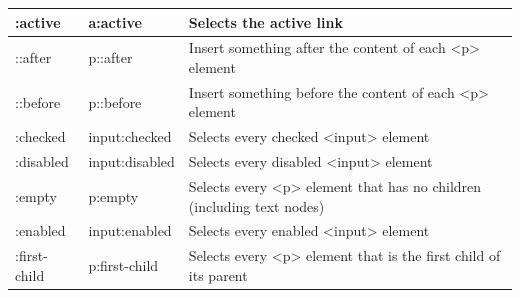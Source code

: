 \documentclass[11pt]{article}
\begin{document}
\begin{tabularx}{\textwidth}{|p{} | p{} | X|}
				\hline
				:active & a:active & Selects the active link \\
				\hline
				::after & p::after & Insert something after the content of each <p> element \\
				\hline
				::before & p::before & Insert something before the content of each <p> element \\
				\hline
				:checked & input:checked & Selects every checked <input> element \\
				\hline
				:disabled & input:disabled & Selects every disabled <input> element \\
				
				\hline
				:empty & p:empty & Selects every <p> element that has no children (including text nodes) \\
				\hline
				:enabled & input:enabled & Selects every enabled <input> element \\
				\hline
				:first-child & p:first-child & Selects every <p> element that is the first child of its parent \\
				\hline
			\end{tabularx}
\end{document}
